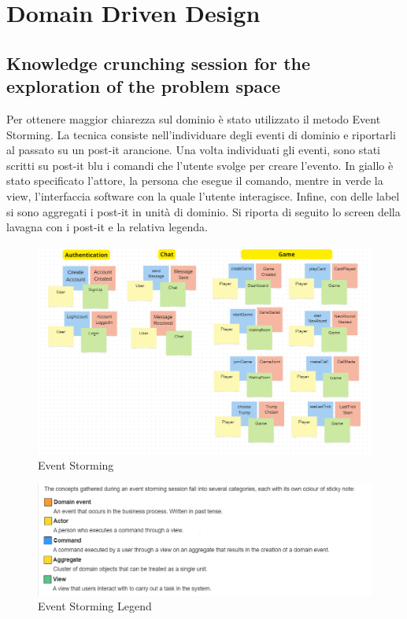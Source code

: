 \chapter{Domain Driven Design}
\label{ch:ddd} %

\section{Knowledge crunching session for the exploration of the problem space}
Per ottenere maggior chiarezza sul dominio è stato utilizzato il metodo Event Storming. 
La tecnica consiste nell'individuare degli eventi di dominio e riportarli al passato su un post-it arancione.
Una volta individuati gli eventi, sono stati scritti su post-it blu i comandi che l'utente svolge per creare l'evento.
In giallo è stato specificato l'attore, la persona che esegue il comando, mentre in verde la view, l'interfaccia software
 con la quale l'utente interagisce.
 Infine, con delle label si sono aggregati i post-it in unità di dominio.
 Si riporta di seguito lo screen della lavagna con i post-it e la relativa legenda.
 \begin{figure}[h!]
    \centering 
    \includegraphics[scale=0.45]{report/img/EventStorming.png}
    \caption{Event Storming}
    \label{event_storming}
\end{figure}

\begin{figure}[h!]
    \centering 
    \includegraphics[scale=0.60]{report/img/Event_storming_legend.png}
    \caption{Event Storming Legend}
    \label{legend}
\end{figure}

